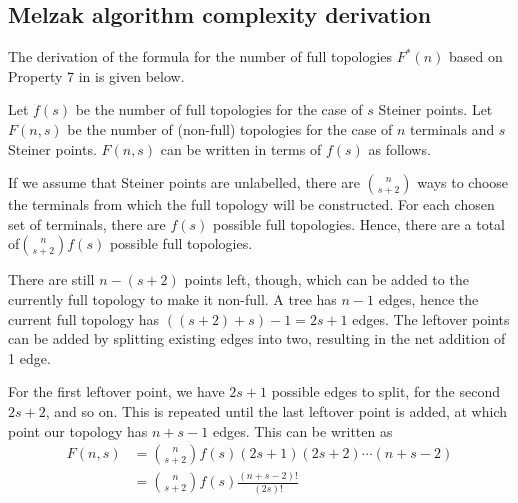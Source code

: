 \documentclass{l4proj}
\begin{document}
\begin{appendices}

    \chapter{Melzak algorithm complexity derivation}
    \label{app:melzak_complexity}

    The derivation of the formula for the number of full topologies $F^*(n)$ based on Property 7 in \cite{Gilbert1968SteinerMT} is given below.

    Let $f(s)$ be the number of full topologies for the case of $s$ Steiner points.
    Let $F(n, s)$ be the number of (non-full) topologies for the case of $n$ terminals and $s$ Steiner points. $F(n, s)$ can be written in terms of $f(s)$ as follows.

    If we assume that Steiner points are unlabelled, there are $\binom{n}{s+2}$ ways to choose the terminals from which the full topology will be constructed. For each chosen set of terminals, there are $f(s)$ possible full topologies. Hence, there are a total of$\binom{n}{s+2}f(s)$ possible full topologies.

    There are still $n - (s + 2)$ points left, though, which can be added to the currently full topology to make it non-full. A tree has $n - 1$ edges, hence the current full topology has $((s + 2) + s) - 1 = 2s + 1$ edges. The leftover points can be added by splitting existing edges into two, resulting in the net addition of 1 edge.

    For the first leftover point, we have $2s + 1$ possible edges to split, for the second $2s + 2$, and so on. This is repeated until the last leftover point is added, at which point our topology has $n + s - 1$ edges. This can be written as
    \begin{equation*}
        \begin{aligned}
            F(n, s) & = \binom{n}{s+2}f(s)(2s + 1)(2s + 2)\cdots(n + s - 2) \\
                    & = \binom{n}{s+2}f(s)\frac{(n + s - 2)!}{(2s)!}
        \end{aligned}
    \end{equation*}


\end{appendices}
\end{document}
